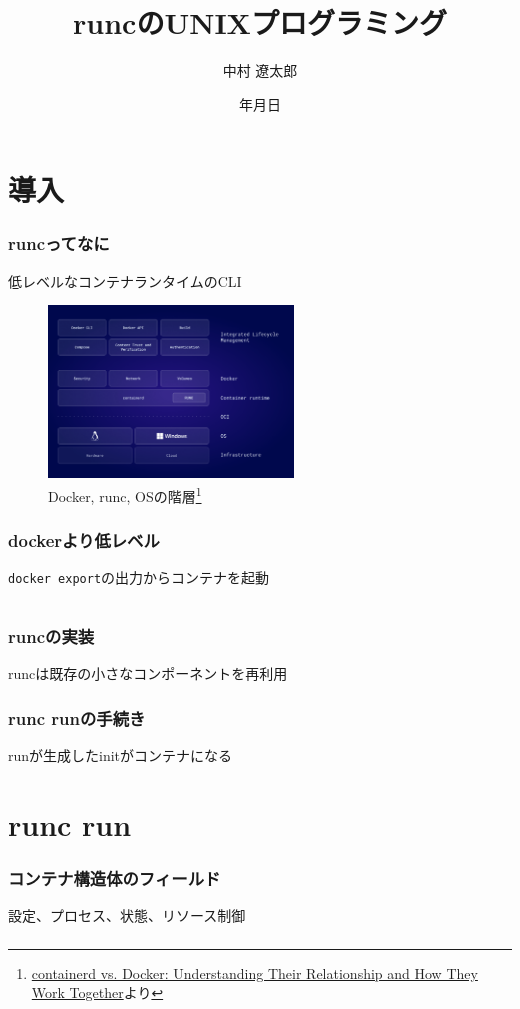 \documentclass[unicode, 14pt, aspectratio=169]{beamer}
\date{\number\year 年\number\month 月\number\day 日}
\title{runcのUNIXプログラミング}
\author{中村 遼太郎}
\begin{document}
\begin{frame}
\titlepage
\end{frame}
\section{導入}
\begin{frame}[t]
  \frametitle{runcってなに}
  低レベルなコンテナランタイムのCLI
  \begin{figure}
    \centering
    \includegraphics[width=6.5cm]{images/containerd-diagram-v1.png}
    \caption{Docker, runc, OSの階層\footnote{\scriptsize{\href{https://www.docker.com/blog/containerd-vs-docker}{containerd vs. Docker: Understanding Their Relationship and How They Work Together}より}}}
    \label{runc}
  \end{figure}
\end{frame}
\begin{frame}[t]
  \frametitle{dockerより低レベル}
  \texttt{docker export}の出力からコンテナを起動\supercite{containerd-vs-docker}
  \inputminted[fontsize=\small]{sh}{code/run.sh}
\end{frame}
\begin{frame}[t]
  \frametitle{runcの実装}
  runcは既存の小さなコンポーネントを再利用
\end{frame}
\begin{frame}[t]
  \frametitle{runc runの手続き}
  runが生成したinitがコンテナになる
\end{frame}
\section{runc run}
\begin{frame}[t]
  \frametitle{コンテナ構造体のフィールド}
  設定、プロセス、状態、リソース制御
\end{frame}
\begin{frame}[t]
  \frametitle{}
\end{frame}
\end{document}
